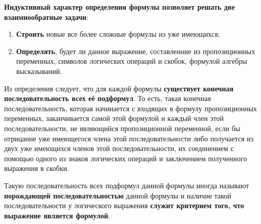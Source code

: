 \documentclass{article}
\begin{document}
\textbf{Индуктивный характер определения формулы позволяет решать две взаимнообратные задачи}:

\begin{enumerate}
    \item \textbf{Строить} новые все более сложные формулы из уже имеющихся;
    \item \textbf{Определять}, будет ли данное выражение, составленние из пропозиционных переменных, символов логических операций и скобок, формулой алгебры высказываний.
\end{enumerate}

Из определения следует, что для каждой формулы \textbf{существует конечная последовательность всех её подформул}. То есть, такая конечная последовательность, которая начинается с входящих в формулу пропозиционных переменных, заканчивается самой этой формулой и каждый член этой последовательности, не являющийся пропозиционной переменной, если бы отрицание уже имеющегося члена этой последовательности либо получается из двух уже имеющихся членов этой последовательности, их соединением с помощью одного из знаков логических операций и заключением полученного выражения в скобки.

Такую последовательность всех подформул данной формулы иногда называют \textbf{порождающей последовательностью} данной формулы и наличие такой последовательности у логического выражения \textbf{служит критерием того, что выражение является формулой}.
\end{document}
